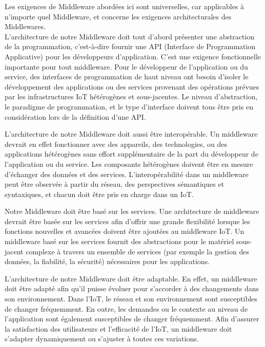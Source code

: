 Les exigences de Middleware abordées ici sont universelles, car applicables à n'importe quel Middleware, et concerne les exigences architecturales des Middlewares.
\\

L'architecture de notre Middleware doit tout d'abord présenter une abstraction de la programmation, c'est-à-dire fournir une API (Interface de Programmation Applicative) pour les développeurs d'application. C'est une exigence fonctionnelle importante pour tout middleware. Pour le développeur de l'application ou du service, des interfaces de programmation de haut niveau ont besoin d'isoler le développement des applications ou des services provenant des opérations prévues par les infrastructures IoT hétérogènes et sous-jacentes. Le niveau d'abstraction, le paradigme de programmation, et le type d'interface doivent tous être pris en considération lors de la définition d'une API.

L'architecture de notre Middleware doit aussi être interopérable. Un middleware devrait en effet fonctionner avec des appareils, des technologies, ou des applications hétérogènes sans effort supplémentaire de la part du développeur de l'application ou du service. Les composants hétérogènes doivent être en mesure d'échanger des données et des services. L'interopérabilité dans un middleware peut être observée à partir du réseau, des perspectives sémantiques et syntaxiques, et chacun doit être pris en charge dans un IoT.

Notre Middleware doit être basé sur les services. Une architecture de middleware devrait être basée sur les services afin d’offrir une grande flexibilité lorsque les fonctions nouvelles et avancées doivent être ajoutées au middleware IoT. Un middleware basé sur les services fournit des abstractions pour le matériel sous-jacent complexe à travers un ensemble de services (par exemple la gestion des données, la fiabilité, la sécurité) nécessaires pour les applications.

L'architecture de notre Middleware doit être adaptable. En effet, un middleware doit être adapté afin qu'il puisse évoluer pour s'accorder à des changements dans son environnement. Dans l'IoT, le réseau et son environnement sont susceptibles de changer fréquemment. En outre, les demandes ou le contexte au niveau de l'application sont également susceptibles de changer fréquemment. Afin d'assurer la satisfaction des utilisateurs et l'efficacité de l'IoT, un middleware doit s’adapter dynamiquement ou s'ajuster à toutes ces variations.

